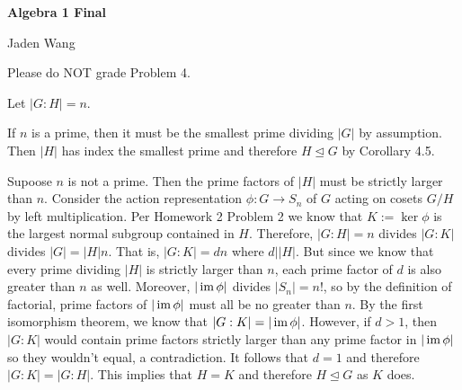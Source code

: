 \documentclass[12pt]{article}
\begin{document}
\centerline {\textsf{\textbf{\LARGE{Algebra 1 Final}}}}
\centerline {Jaden Wang}
\vspace{.15in}
Please do NOT grade Problem 4.

\begin{problem}[1]
Let $ |G:H| = n$.  
\begin{case}[1]
If $ n$ is a prime, then it must be the smallest prime dividing  $ |G|$ by assumption. Then $ |H|$ has index the smallest prime and therefore  $ H \trianglelefteq G$ by Corollary 4.5.
\end{case}
\begin{case}[2]
Supoose $ n$ is not a prime. Then the prime factors of $ |H|$ must be strictly  larger than $ n$. Consider the action representation $ \phi: G \to S_n$ of $ G$ acting on cosets $ G /H$ by left multiplication. Per Homework 2 Problem 2 we know that $ K:=\ker \phi$ is the largest normal subgroup contained in $ H$. Therefore,  $|G:H| =n$ divides $ |G:K| $ divides $ |G|=|H|n$. That is, $ |G:K| = dn$ where  $ d| |H|$. But since we know that every prime dividing  $ |H|$ is strictly larger than $ n$, each prime factor of $ d$ is also greater than $ n$ as well. Moreover,  $ |\operatorname{im} \phi| $ divides $ |S_n|=n!$, so by the definition of factorial, prime factors of $ |\operatorname{im} \phi|$ must all be no greater than  $ n$. By the first isomorphism theorem, we know that  $ |G:K| = | \operatorname{im} \phi|$. However, if $ d > 1$, then  $ |G:K|$ would contain prime factors strictly larger than any prime factor in $ | \operatorname{im} \phi|$ so they wouldn't equal, a contradiction. It follows that $ d=1$ and therefore  $ |G:K| = |G:H|$. This implies that  $ H= K$ and therefore  $ H \trianglelefteq G$ as $ K$ does.
\end{case}
\end{problem}
\end{document}
